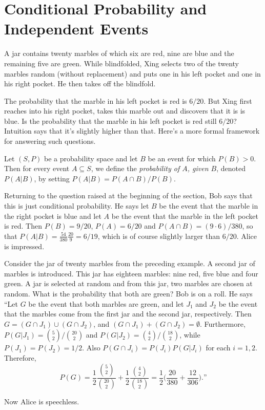\section{Conditional Probability and Independent Events}\label{s:probability:conditional}

A jar contains twenty marbles of which six are red, nine are blue
and the remaining five are green.  While blindfolded, Xing selects two of the twenty 
marbles random (without replacement) and puts one in his left pocket and
one in his right pocket.  He then takes off the blindfold.

The probability that the marble in his left pocket is red is $6/20$.
But Xing first reaches into his right pocket, takes this marble out and
discovers that it is is blue.  Is the probability that the marble in
his left pocket is red still $6/20$?  Intuition says that it's slightly
higher than that.  Here's a more formal framework for answering such
questions.

Let $(S,P)$ be a probability space and let $B$ be an event for
which $P(B)>0$.  Then for every event $A\subseteq S$, we define
the \textit{probability of $A$, given $B$}, denoted $P(A|B)$, by setting
$P(A|B)=P(A\cap B)/P(B)$.  

\begin{discussion}
  Returning to the question raised at the beginning of the section,
  Bob says that this is just conditional probability. He says let $B$
  be the event that the marble in the right pocket is blue and let $A$
  be the event that the marble in the left pocket is red.  Then
  $P(B)=9/20$, $P(A) = 6/20$ and $P(A\cap B)=(9\cdot6)/380$, so that
  $P(A|B)= \frac{54}{380}\frac{20}{9}=6/19$, which is of course
  slightly larger than $6/20$.  Alice is impressed.
\end{discussion}

\begin{example}\label{exa:twojars}
  Consider the jar of twenty marbles from the preceding example.  A
  second jar of marbles is introduced.  This jar has eighteen marbles:
  nine red, five blue and four green.  A jar is selected at random and
  from this jar, two marbles are chosen at random.  What is the
  probability that both are green?  Bob is on a roll.  He says ``Let $G$
  be the event that both marbles are green, and let $J_1$ and $J_2$ be
  the event that the marbles come from the first jar and the second
  jar, respectively.  Then $G= (G\cap J_1)\cup (G\cap J_2)$, and
  $(G\cap J_1)+(G\cap J_2)=\emptyset$.  Furthermore,
  $P(G|J_1)=\binom{5}{2}/\binom{20}{2}$ and
  $P(G|J_2)=\binom{4}{2}/\binom{18}{2}$, while $P(J_1)=P(J_2)=1/2$.
  Also $P(G\cap J_i)=P(J_i)P(G|J_i)$ for each $i=1,2$.  Therefore,
\[
P(G)=\frac{1}{2}\frac{\binom{5}{2}}{\binom{20}{2}}+
\frac{1}{2}\frac{\binom{4}{2}}{\binom{18}{2}}=\frac{1}{2}\bigl(\frac{20}{380}+
\frac{12}{306}\bigr).\text{''}
\]

Now Alice is speechless.
\end{example}

